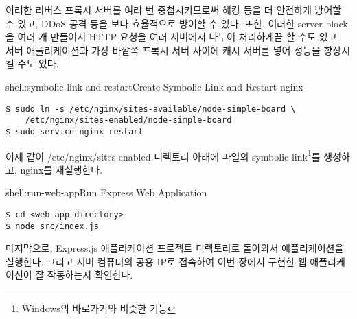 이러한 리버스 프록시 서버를 여러 번 중첩시키므로써 해킹 등을 더 안전하게 방어할 수 있고, DDoS 공격 등을 보다 효율적으로 방어할 수 있다. 또한, 이러한 server block을 여러 개 만들어서 HTTP 요청을 여러 서버에서 나누어 처리하게끔 할 수도 있고, 서버 애플리케이션과 가장 바깥쪽 프록시 서버 사이에 캐시 서버를 넣어 성능을 향상시킬 수도 있다.

\begin{shell}{shell:symbolic-link-and-restart}{Create Symbolic Link and Restart nginx}
\begin{verbatim}
$ sudo ln -s /etc/nginx/sites-available/node-simple-board \
    /etc/nginx/sites-enabled/node-simple-board
$ sudo service nginx restart
\end{verbatim}
\end{shell}

이제 \와 같이 /etc/nginx/sites-enabled 디렉토리 아래에  파일의 symbolic link\footnote{Windows의 바로가기와 비슷한 기능}를 생성하고, nginx를 재실행한다.

\begin{shell}{shell:run-web-app}{Run Express Web Application}
\begin{verbatim}
$ cd <web-app-directory>
$ node src/index.js
\end{verbatim}
\end{shell}

마지막으로, Express.js 애플리케이션 프로젝트 디렉토리로 돌아와서 애플리케이션을 실행한다. 그리고 서버 컴퓨터의 공용 IP로 접속하여 이번 장에서 구현한 웹 애플리케이션이 잘 작동하는지 확인한다.
